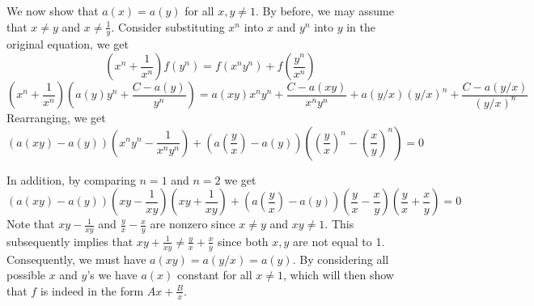 \documentclass[11pt,a4paper]{article}
\begin{document}
\begin{enumerate}
    We now show that $a(x)=a(y)$ for all $x, y\neq 1$. 
    By before, we may assume that $x\neq y$ and $x\neq \frac{1}{y}$. 
    Consider substituting $x^n$ into $x$ and $y^n$ into $y$ in the original equation, we get 
    \[
    \left(x^n + \frac {1}{x^n}\right) f(y^n) = f(x^ny^n) + f(\frac{y^n}{x^n})
    \]
    \[
    \left(x^n + \frac {1}{x^n}\right) \left(a(y) y^n + \frac{C - a(y)}{y^n}\right) = a(xy) x^ny^n + \frac{C - a(xy)}{x^ny^n} 
    + a(y/x) (y/x)^n + \frac{C - a(y/x)}{(y/x)^n}
    \]
    Rearranging, we get 
    \[
    (a(xy) - a(y))(x^ny^n - \frac{1}{x^ny^n})
    +(a(\frac{y}{x}) - a(y))((\frac{y}{x})^n - (\frac{x}{y})^n) = 0
    \]
    
    In addition, by comparing $n=1$ and $n=2$ we get 
    \[
    (a(xy) - a(y))(xy - \frac{1}{xy})(xy + \frac{1}{xy})
    +(a(\frac{y}{x}) - a(y))(\frac{y}{x} - \frac{x}{y})(\frac{y}{x} + \frac{x}{y}) = 0
    \]
    Note that $xy - \frac{1}{xy}$ and $\frac{y}{x} - \frac{x}{y}$ are nonzero since $x\neq y$ and $xy\neq 1$. 
    This subsequently implies that $xy + \frac{1}{xy}\neq \frac{y}{x} + \frac{x}{y}$ since both $x, y$ are not equal to 1. 
    Consequently, we must have $a(xy)=a(y/x)=a(y)$. 
    By considering all possible $x$ and $y$'s we have $a(x)$ constant for all $x\neq 1$, 
    which will then show that $f$ is indeed in the form $Ax+\frac{B}{x}$. 
    
\end{enumerate}
\end{document}
